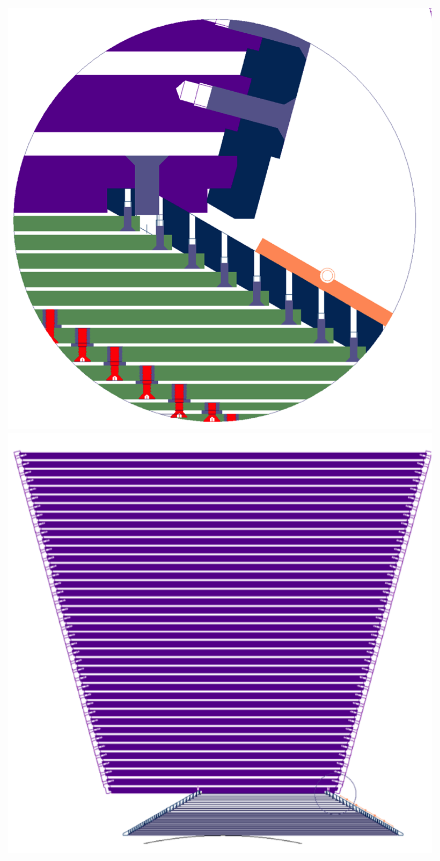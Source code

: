 \begin{figure}
	\begin{minipage}[b]{.49\textwidth}
		\includegraphics[width=\linewidth]{Calorimeter/SiliconTungstenSiD/edgeFasteners}
		\caption{}
		\label{fig:Calorimeter:SiDECAL:edgeFasteners}
	\end{minipage}\hfill
	\begin{minipage}[b]{.49\textwidth}
		\includegraphics[width=\linewidth]{Calorimeter/SiliconTungstenSiD/ecalMounting}
		\caption{}
		\label{fig:Calorimeter:SiDECAL:ecalMounting}
	\end{minipage}
\end{figure}
